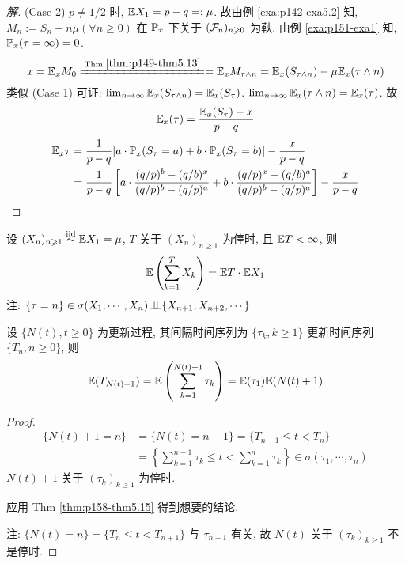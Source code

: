 \begin{proof}[解]
(Case 2) $p\neq 1/2$ 时, $\mathbb E X_1=p-q=:\mu$. 故由例 \ref{exa:p142-exa5.2} 知, $M_n:=S_n-n\mu(\forall n\geq 0)$ 在 $\mathbb{P}_x$ 下关于 $(\mathcal{F}_n)_{n\geqslant 0}$ 为鞅. 由例 \ref{exa:p151-exa1} 知, $\mathbb{P}_x(\tau=\infty)=0$.
\[
x=\EE_x M_0\xlongequal{\text{Thm } \ref{thm:p149-thm5.13}}=\EE_x M_{\tau\land n}=\EE_x(S_{\tau\land n})-\mu \EE_x(\tau\land n)
\]
类似 (Case 1) 可证: $\lim_{n \to \infty}\mathbb E_x(S_{\tau\land n})=\mathbb E_x(S_{\tau})$. $\lim_{n \to \infty}\mathbb E_x (\tau\land n)=\mathbb E_x(\tau)$. 故
\[
\mathbb E_x(\tau)=\frac{\mathbb E_x(S_{\tau})-x}{p-q}
\]
\[
\begin{aligned}
    \mathbb E_x\tau&=\frac{1}{p-q}[a\cdot\mathbb{P}_x(S_{\tau}=a)+b\cdot\mathbb{P}_x(S_{\tau}=b)]-\frac{x}{p-q}\\
    &=\frac{1}{p-q}\left[
        a\cdot \frac{(q/p)^b-(q/b)^x}{(q/p)^b-(q/p)^a}+b\cdot \frac{(q/p)^x-(q/b)^a}{(q/p)^b-(q/p)^a}
    \right]-\frac{x}{p-q}
\end{aligned}
\]
\end{proof}

\begin{theorem}[Wald等式]\label{thm:p158-thm5.15}
    设 $(X_n)_{n\geqslant 1}\overset{\text{iid}}{\sim}\mathbb E X_1=\mu$, $T$ 关于 $(X_n)_{n\geq 1}$ 为停时, 且 $\mathbb E T<\infty$, 则
    \[
    \mathbb E\left(
        \sum_{k=1}^T X_k
    \right)=\mathbb E T\cdot \mathbb E X_1
    \]
    注: $\{\tau=n\}\in \sigma(X_1,\cdots,X_n)\operatorname{\perp\!\!\!\perp} \{X_{n+1},X_{n+2},\cdots\}$
\end{theorem}

\begin{corollary}
    设 $\{N(t),t\geq 0\}$ 为更新过程, 其间隔时间序列为 $\{\tau_k,k\geq 1\}$ 更新时间序列 $\{T_n,n\geq 0\}$, 则
    \[
    \mathbb E(T_{N(t)+1})=\mathbb E \left(
        \sum_{k=1}^{N(t)+1}\tau_k
    \right)=\mathbb E (\tau_1)\mathbb E(N(t)+1)
    \]
\end{corollary}

\begin{proof}
    \[
    \begin{aligned}
        \{N(t)+1=n\} &=\{N(t)=n-1\}=\{T_{n-1}\leq t< T_n\}\\
        &=\left\{
            \sum_{k=1}^{n-1}\tau_k\leq t<\sum_{k=1}^n\tau_k
        \right\}\in\sigma(\tau_1,\cdots,\tau_n)
    \end{aligned}
    \]
    $N(t)+1$ 关于 $(\tau_k)_{k\geq 1}$ 为停时.

    应用 Thm \ref{thm:p158-thm5.15} 得到想要的结论.

    注: $\{N(t)=n\}=\{T_n\leq t<T_{n+1}\}$ 与 $\tau_{n+1}$ 有关, 故 $N(t)$ 关于 $(\tau_k)_{k\geq 1}$ 不是停时.
\end{proof}
\newpage